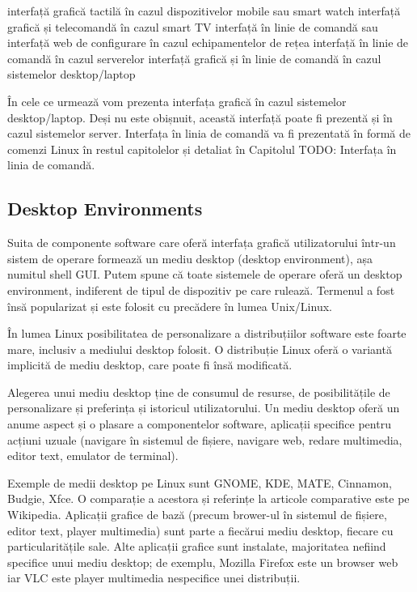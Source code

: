 interfață grafică tactilă în cazul dispozitivelor mobile sau smart watch
interfață grafică și telecomandă în cazul smart TV
interfață în linie de comandă sau interfață web de configurare în cazul echipamentelor de rețea
interfață în linie de comandă în cazul serverelor
interfață grafică și în linie de comandă în cazul sistemelor desktop/laptop

În cele ce urmează vom prezenta interfața grafică în cazul sistemelor desktop/laptop. Deși nu este obișnuit, această interfață poate fi prezentă și în cazul sistemelor server. Interfața în linia de comandă va fi prezentată în formă de comenzi Linux în restul capitolelor și detaliat în Capitolul TODO: Interfața în linia de comandă.

\subsection{Desktop Environments}
\label{sec:ui:desktop-environments}

Suita de componente software care oferă interfața grafică utilizatorului într-un sistem de operare formează un mediu desktop (desktop environment), așa numitul shell GUI. Putem spune că toate sistemele de operare oferă un desktop environment, indiferent de tipul de dispozitiv pe care rulează. Termenul a fost însă popularizat și este folosit cu precădere în lumea Unix/Linux.

În lumea Linux posibilitatea de personalizare a distribuțiilor software este foarte mare, inclusiv a mediului desktop folosit. O distribuție Linux oferă o variantă implicită de mediu desktop, care poate fi însă modificată.

Alegerea unui mediu desktop ține de consumul de resurse, de posibilitățile de personalizare și preferința și istoricul utilizatorului. Un mediu desktop oferă un anume aspect și o plasare a componentelor software, aplicații specifice pentru acțiuni uzuale (navigare în sistemul de fișiere, navigare web, redare multimedia, editor text, emulator de terminal).

Exemple de medii desktop pe Linux sunt GNOME, KDE, MATE, Cinnamon, Budgie, Xfce. O comparație a acestora și referințe la articole comparative este pe Wikipedia. Aplicații grafice de bază (precum brower-ul în sistemul de fișiere, editor text, player multimedia) sunt parte a fiecărui mediu desktop, fiecare cu particularitățile sale. Alte aplicații grafice sunt instalate, majoritatea nefiind specifice unui mediu desktop; de exemplu, Mozilla Firefox este un browser web iar VLC este player multimedia nespecifice unei distribuții.

